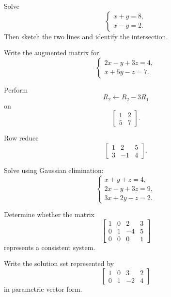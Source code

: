 \begin{exercise}[1]
Solve
\[ \begin{cases}
x+y=8,\\
x-y=2.
\end{cases} \]
Then sketch the two lines and identify the intersection.
\end{exercise}

\begin{exercise}[1]
Write the augmented matrix for
\[ \begin{cases}
2x-y+3z=4,\\
x+5y-z=7.
\end{cases} \]
\end{exercise}

\begin{exercise}[1]
Perform
\[ R_2\leftarrow R_2-3R_1 \]
on
\[ \begin{bmatrix}1&2\\5&7\end{bmatrix}. \]
\end{exercise}

\begin{exercise}[2]
Row reduce
\[ \left[\begin{array}{cc|c}
1&2&5\\
3&-1&4
\end{array}\right]. \]
\end{exercise}

\begin{exercise}[2]
Solve using Gaussian elimination:
\[ \begin{cases}
x+y+z=4,\\
2x-y+3z=9,\\
3x+2y-z=2.
\end{cases} \]
\end{exercise}

\begin{exercise}[2]
Determine whether the matrix
\[ \left[\begin{array}{ccc|c}
1&0&2&3\\
0&1&-4&5\\
0&0&0&1
\end{array}\right] \]
represents a consistent system.
\end{exercise}

\begin{exercise}[2]
Write the solution set represented by
\[ \left[\begin{array}{ccc|c}
1&0&3&2\\
0&1&-2&4
\end{array}\right] \]
in parametric vector form.
\end{exercise}


